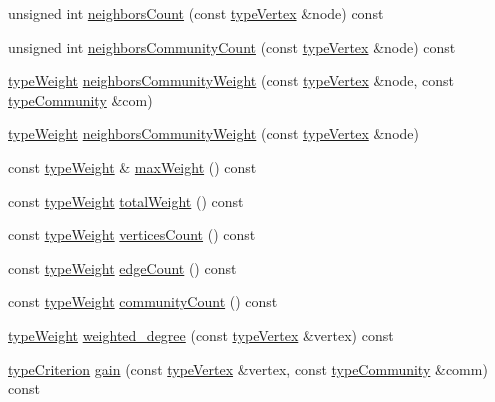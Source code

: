 \begin{DoxyCompactItemize}
\item 
unsigned int \hyperlink{classAlgorithmLouvain_a2fb0859e6b2dfdd4285cc865a2b2531f}{neighbors\+Count} (const \hyperlink{edge_8h_a5fbd20c46956d479cb10afc9855223f6}{type\+Vertex} \&node) const
\item 
unsigned int \hyperlink{classAlgorithmLouvain_a69439ee5f0cf1180d15a244500bfc663}{neighbors\+Community\+Count} (const \hyperlink{edge_8h_a5fbd20c46956d479cb10afc9855223f6}{type\+Vertex} \&node) const
\item 
\hyperlink{edge_8h_a2e7ea3be891ac8b52f749ec73fee6dd2}{type\+Weight} \hyperlink{classAlgorithmLouvain_a133f057d5d84332e347a0f01700101ae}{neighbors\+Community\+Weight} (const \hyperlink{edge_8h_a5fbd20c46956d479cb10afc9855223f6}{type\+Vertex} \&node, const \hyperlink{graphUndirectedGroupable_8h_a914da95c9ea7f14f4b7f875c36818556}{type\+Community} \&com)
\item 
\hyperlink{edge_8h_a2e7ea3be891ac8b52f749ec73fee6dd2}{type\+Weight} \hyperlink{classAlgorithmLouvain_a97fc0efead8492fc78167a3ad4f808fc}{neighbors\+Community\+Weight} (const \hyperlink{edge_8h_a5fbd20c46956d479cb10afc9855223f6}{type\+Vertex} \&node)
\item 
const \hyperlink{edge_8h_a2e7ea3be891ac8b52f749ec73fee6dd2}{type\+Weight} \& \hyperlink{classAlgorithmLouvain_a0b2ef33d5d1bf8b9aa2f8c73921844ac}{max\+Weight} () const
\item 
const \hyperlink{edge_8h_a2e7ea3be891ac8b52f749ec73fee6dd2}{type\+Weight} \hyperlink{classAlgorithmLouvain_a6b38d3b1af94bb426b953473aa5647a4}{total\+Weight} () const
\item 
const \hyperlink{edge_8h_a2e7ea3be891ac8b52f749ec73fee6dd2}{type\+Weight} \hyperlink{classAlgorithmLouvain_ab132e4f38f353713dc8c0c89b3bde576}{vertices\+Count} () const
\item 
const \hyperlink{edge_8h_a2e7ea3be891ac8b52f749ec73fee6dd2}{type\+Weight} \hyperlink{classAlgorithmLouvain_aa4b25143d94b4fabc830ea053b76dd7d}{edge\+Count} () const
\item 
const \hyperlink{edge_8h_a2e7ea3be891ac8b52f749ec73fee6dd2}{type\+Weight} \hyperlink{classAlgorithmLouvain_a8a8af8c837dd1a24a6be7904121edbbd}{community\+Count} () const
\item 
\hyperlink{edge_8h_a2e7ea3be891ac8b52f749ec73fee6dd2}{type\+Weight} \hyperlink{classAlgorithmLouvain_a75a05ca235819217d3a91c1bd45def43}{weighted\+\_\+degree} (const \hyperlink{edge_8h_a5fbd20c46956d479cb10afc9855223f6}{type\+Vertex} \&vertex) const
\item 
\hyperlink{criterionInterface_8h_af71ff22f6355fd69a4a62104bfd59a83}{type\+Criterion} \hyperlink{classAlgorithmLouvain_adcd4a8dc566881f9c1b1d9e78730a503}{gain} (const \hyperlink{edge_8h_a5fbd20c46956d479cb10afc9855223f6}{type\+Vertex} \&vertex, const \hyperlink{graphUndirectedGroupable_8h_a914da95c9ea7f14f4b7f875c36818556}{type\+Community} \&comm) const

\end{DoxyCompactItemize}
